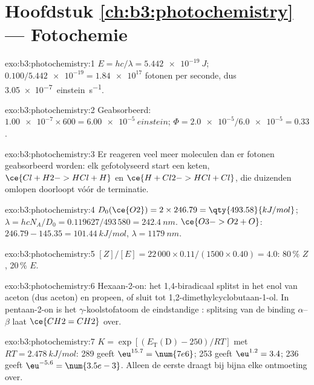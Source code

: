 \section*{Hoofdstuk \ref{ch:b3:photochemistry} --- Fotochemie}

\begin{solution}{exo:b3:photochemistry:1}
$E = hc/\lambda = \qty{5.442e-19}{J}$; $0.100/\num{5.442e-19} = \num{1.84e17}$
fotonen per seconde, dus
\qty{3.05e-7}{einstein.s^{-1}}.
\end{solution}

\begin{solution}{exo:b3:photochemistry:2}
Geabsorbeerd: $\num{1.00e-7} \times 600 = \qty{6.00e-5}{einstein}$; $\Phi = \num{2.0e-5}/\num{6.0e-5} = 0.33$.
\end{solution}

\begin{solution}{exo:b3:photochemistry:3}
Er reageren veel meer moleculen dan er fotonen geabsorbeerd worden: elk
gefotolyseerd  start een
keten, $\ce{Cl + H2 -> HCl + H}$ en $\ce{H + Cl2 -> HCl + Cl}$, die
duizenden omlopen doorloopt vóór de terminatie.
\end{solution}

\begin{solution}{exo:b3:photochemistry:4}
$D_0(\ce{O2}) = 2 \times 246.79 = \qty{493.58}{kJ/mol}$; $\lambda = hcN_A/D_0 = 0.119627/493\,580 =
\qty{242.4}{nm}$. $\ce{O3 -> O2 + O}$: $246.79 - 145.35 = \qty{101.44}{kJ/mol}$, $\lambda = \qty{1179}{nm}$.
\end{solution}

\begin{solution}{exo:b3:photochemistry:5}
$[Z]/[E] = 22\,000 \times 0.11/(1500 \times 0.40) = 4.0$: 80\,\% $Z$, 20\,\% $E$.
\end{solution}

\begin{solution}{exo:b3:photochemistry:6}
Hexaan-2-on: het 1,4-biradicaal splitst in het enol van aceton (dus
aceton) en propeen, of sluit tot 1,2-dimethylcyclobutaan-1-ol. In
pentaan-2-on is het $\gamma$-koolstofatoom de eindstandige :
splitsing van de binding $\alpha$--$\beta$ laat $\ce{CH2=CH2}$ over.
\end{solution}

\begin{solution}{exo:b3:photochemistry:7}
$K = \exp[(E_{\mathrm T}(\mathrm D) - 250)/RT]$ met $RT = \qty{2.478}{kJ/mol}$: 289 geeft $\eu^{15.7} = \num{7e6}$;
253 geeft $\eu^{1.2} = 3.4$; 236 geeft $\eu^{-5.6} = \num{3.5e-3}$. Alleen de
eerste draagt bij bijna elke ontmoeting over.
\end{solution}

